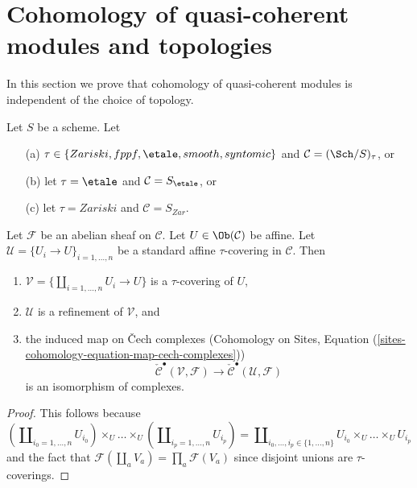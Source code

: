 \section{Cohomology of quasi-coherent modules and topologies}
\label{section-quasi-coherent-cohomology}

\noindent
In this section we prove that cohomology of quasi-coherent
modules is independent of the choice of topology.

\begin{lemma}
\label{lemma-standard-covering-Cech}
Let $S$ be a scheme. Let
\begin{enumerate}
\item[(a)] $\tau \in \{Zariski, \linebreak[0] fppf, \linebreak[0]
\etale, \linebreak[0] smooth, \linebreak[0] syntomic\}$
and $\mathcal{C} = (\Sch/S)_\tau$, or
\item[(b)] let $\tau = \etale$ and $\mathcal{C} = S_\etale$, or
\item[(c)] let $\tau = Zariski$ and $\mathcal{C} = S_{Zar}$.
\end{enumerate}
Let $\mathcal{F}$ be an abelian sheaf on $\mathcal{C}$.
Let $U \in \Ob(\mathcal{C})$ be affine.
Let $\mathcal{U} = \{U_i \to U\}_{i = 1, \ldots, n}$ be a standard affine
$\tau$-covering in $\mathcal{C}$. Then
\begin{enumerate}
\item $\mathcal{V} = \{\coprod_{i = 1, \ldots, n} U_i \to U\}$ is a
$\tau$-covering of $U$,
\item $\mathcal{U}$ is a refinement of $\mathcal{V}$, and
\item the induced map on {\v C}ech complexes
(Cohomology on Sites,
Equation (\ref{sites-cohomology-equation-map-cech-complexes}))
$$
\check{\mathcal{C}}^\bullet(\mathcal{V}, \mathcal{F})
\longrightarrow
\check{\mathcal{C}}^\bullet(\mathcal{U}, \mathcal{F})
$$
is an isomorphism of complexes.
\end{enumerate}
\end{lemma}

\begin{proof}
This follows because
$$
(\coprod\nolimits_{i_0 = 1, \ldots, n} U_{i_0}) \times_U
\ldots \times_U
(\coprod\nolimits_{i_p = 1, \ldots, n} U_{i_p})
=
\coprod\nolimits_{i_0, \ldots, i_p \in \{1, \ldots, n\}}
U_{i_0} \times_U \ldots \times_U U_{i_p}
$$
and the fact that $\mathcal{F}(\coprod_a V_a) = \prod_a \mathcal{F}(V_a)$
since disjoint unions are $\tau$-coverings.
\end{proof}


